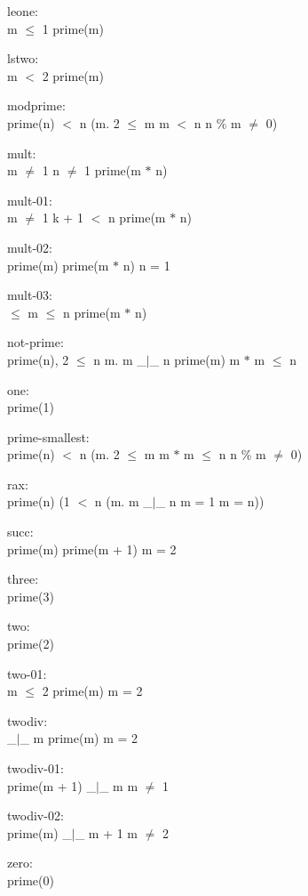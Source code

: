 \documentclass[a4paper]{article}
\begin{document}
leone:\\ \Fol m $\le$ 1 \Imp \Not prime(m)

lstwo:\\ \Fol m $<$ 2 \Imp \Not prime(m)

modprime:\\ \Fol prime(n)  $<$ n \And (\All m. 2 $\le$ m \And m $<$ n \Imp n \% m $\neq$ 0)

mult:\\ \Fol m $\neq$ 1 \And n $\neq$ 1 \Imp \Not prime(m $*$ n)

mult-01:\\ \Fol m $\neq$ 1 \And k + 1 $<$ n \Imp \Not prime(m $*$ n)

mult-02:\\ \Fol prime(m) \Imp prime(m $*$ n) \Equiv n = 1

mult-03:\\  $\le$ m  $\le$ n \Imp \Not prime(m $*$ n)

not-prime:\\\Not prime(n), 2 $\le$ n \Fol \Ex m. m \_$|$\_ n \And prime(m) \And m $*$ m $\le$ n

one:\\ \Fol \Not prime(1)

prime-smallest:\\ \Fol prime(n)  $<$ n \And (\All m. 2 $\le$ m \And m $*$ m $\le$ n \Imp n \% m $\neq$ 0)

rax:\\ \Fol prime(n) \Equiv \Not \Not (1 $<$ n \And (\All m. m \_$|$\_ n \Imp m = 1 \Or m = n))

succ:\\ \Fol prime(m) \Imp prime(m + 1) \Equiv m = 2

three:\\ \Fol prime(3)

two:\\ \Fol prime(2)

two-01:\\ \Fol m $\le$ 2 \Imp prime(m) \Equiv m = 2

twodiv:\\  \_$|$\_ m \Imp prime(m) \Equiv m = 2

twodiv-01:\\ \Fol prime(m + 1)  \_$|$\_ m \Equiv m $\neq$ 1

twodiv-02:\\ \Fol prime(m)  \_$|$\_ m + 1 \Equiv m $\neq$ 2

zero:\\ \Fol \Not prime(0)
\end{document}

